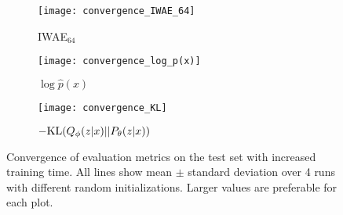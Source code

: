 
\begin{figure*}[t!]
	\centering
	\begin{subfigure}[b]{0.33\textwidth}
		\centering
		\texttt{[image: convergence\_IWAE\_64]}\vspace{-2pt}
		\caption{\textsc{IWAE}$_{64}$ \label{fig:mnistexpt/convergence/iwae64}}
	\end{subfigure}
	\begin{subfigure}[b]{0.33\textwidth}
		\centering
		\texttt{[image: convergence\_log\_p(x)]}\vspace{-2pt}
		\caption{$\log \hat{p}(x)$ \label{fig:mnistexpt/convergence/logpx}}
	\end{subfigure}
	\begin{subfigure}[b]{0.33\textwidth}
		\centering
		\texttt{[image: convergence\_KL]}\vspace{-2pt}
		\caption{$-\mathrm{KL}(Q_{\phi}(z \lvert x) || P_{\theta}(z \lvert x))$ \label{fig:mnistexpt/convergence/kl}}
	\end{subfigure}\vspace{-6pt}
	\caption{Convergence of evaluation metrics on the test set with increased training time. 
		All lines show mean $\pm$ standard deviation 
		over 4 runs with different random
		initializations. Larger values are preferable for each plot.
		\vspace{-8pt}  \label{fig:mnistexpt/convergence}}
\end{figure*}

